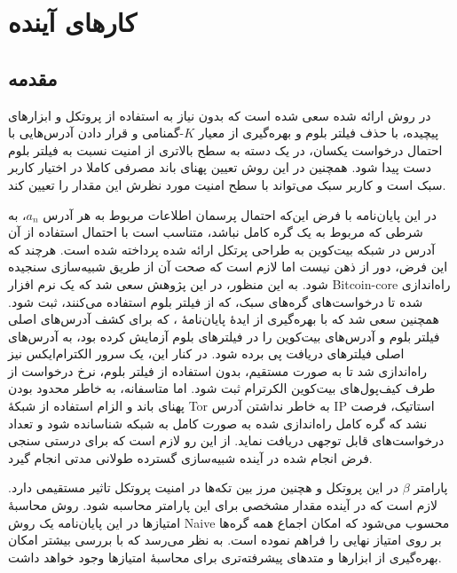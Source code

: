 \chapter{کار‌های آینده}
\label{chap:results}
\section{مقدمه} 
در روش ارائه شده سعی شده است که بدون نیاز به استفاده از پروتکل و ابزار‌های پیچیده، با حذف فیلتر بلوم و بهره‌گیری از معیار ‌$K$-گمنامی و قرار دادن آدرس‌هایی با احتمال درخواست یکسان، در یک دسته به سطح بالاتری از امنیت نسبت به فیلتر بلوم دست پیدا شود. همچنین در این روش تعیین پهنای باند مصرفی کاملا در اختیار کاربر سبک است و کاربر سبک می‌تواند با سطح امنیت مورد نظرش این مقدار را تعیین کند.

در این پایان‌نامه با فرض این‌که احتمال پرسمان اطلاعات مربوط به هر آدرس $a_n$، به شرطی که مربوط به یک گره کامل نباشد، متناسب است با احتمال استفاده از آن آدرس در شبکه بیت‌کوین به طراحی پرتکل ارائه شده پرداخته شده است. هرچند که این فرض،‌ دور از ذهن نیست اما لازم است که صحت آن از طریق شبیه‌سازی سنجیده شود. به این منظور، در این  پژوهش سعی شد که یک نرم افزار 
\gls{Bitcoin-core}
راه‌اندازی شده تا درخواست‌های گره‌های سبک، که از فیلتر بلوم استفاده می‌کنند، ثبت شود. همچنین سعی شد که با بهره‌گیری از ایدهٔ پایان‌نامهٔ \cite{Nick2015}، که برای کشف آدرس‌های اصلی فیلتر بلوم  و  آدرس‌های بیت‌کوین را در فیلتر‌های بلوم آزمایش کرده بود، به آدرس‌های اصلی فیلترهای دریافت پی برده شود. در کنار این، یک سرور
الکترام‌ایکس
نیز راه‌اندازی شد تا به صورت مستقیم، بدون استفاده از فیلتر بلوم، نرخ درخواست از طرف کیف‌پول‌های بیت‌کوین الکرترام ثبت شود. اما متاسفانه، به خاطر محدود بودن پهنای باند و الزام استفاده از شبکهٔ 
\gls{Tor}
به خاطر نداشتن آدرس IP استاتیک، فرصت نشد که گره‌ کامل راه‌اندازی شده به صورت کامل به شبکه شناسانده شود و تعداد درخواست‌های قابل توجهی دریافت نماید. از این رو لازم است که برای درستی سنجی فرض انجام شده در آینده شبیه‌سازی‌ گسترده طولانی مدتی انجام گیرد. 

پارامتر $\beta$ در این پروتکل و هچنین مرز بین تکه‌ها در امنیت پروتکل تاثیر مستقیمی دارد. لازم است که در آینده مقدار مشخصی برای این پارامتر محاسبه شود. روش محاسبهٔ امتیازها در این پایان‌نامه یک روش 
\gls{Naive} 
محسوب می‌شود که امکان اجماع همه گره‌ها بر روی امتیاز نهایی را فراهم نموده است. به نظر می‌رسد که با بررسی بیشتر امکان بهره‌گیری از ابزار‌ها و متدهای پیشرفته‌تری برای محاسبهٔ امتیا‌ز‌ها وجود خواهد داشت.

